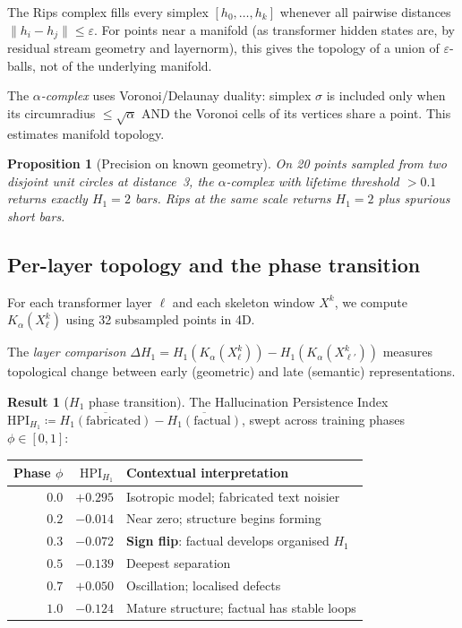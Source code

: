 \documentclass[11pt]{amsart}
\newtheorem{proposition}[theorem]{Proposition}
\theoremstyle{definition}
\newtheorem{result}[theorem]{Result}
\newcommand{\Ka}{K_\alpha}
\newcommand{\defeq}{\coloneqq}
\begin{document}
The Rips complex fills every simplex $[h_0,\ldots,h_k]$
whenever all pairwise distances $\|h_i - h_j\| \leq \varepsilon$.
For points near a manifold (as transformer hidden states are,
by residual stream geometry and layernorm), this gives the topology
of a union of $\varepsilon$-balls, not of the underlying manifold.

The \emph{$\alpha$-complex} uses Voronoi/Delaunay duality:
simplex $\sigma$ is included only when its circumradius $\leq \sqrt{\alpha}$
AND the Voronoi cells of its vertices share a point.
This estimates manifold topology.

\begin{proposition}[Precision on known geometry]
On 20 points sampled from two disjoint unit circles at distance~3,
the $\alpha$-complex with lifetime threshold $> 0.1$ returns exactly
$H_1 = 2$ bars.
Rips at the same scale returns $H_1 = 2$ plus spurious short bars.
\end{proposition}

\subsection{Per-layer topology and the phase transition}

For each transformer layer $\ell$ and each skeleton window $X^k$,
we compute $\Ka(X^k_\ell)$ using 32 subsampled points in 4D.

The \emph{layer comparison} $\Delta H_1 = H_1(\Ka(X^k_\ell)) - H_1(\Ka(X^k_{\ell'}))$
measures topological change between early (geometric) and late (semantic)
representations.

\begin{result}[$H_1$ phase transition]
\label{result:h1phase}
The Hallucination Persistence Index
$\mathrm{HPI}_{H_1} \defeq \overline{H_1(\text{fabricated})} - \overline{H_1(\text{factual})}$,
swept across training phases $\phi \in [0,1]$:
\begin{center}
\begin{tabular}{@{}rrl@{}}
\toprule
Phase $\phi$ & $\mathrm{HPI}_{H_1}$ & Contextual interpretation \\
\midrule
$0.0$ & $+0.295$ & Isotropic model; fabricated text noisier \\
$0.2$ & $-0.014$ & Near zero; structure begins forming \\
$0.3$ & $-0.072$ & \textbf{Sign flip}: factual develops organised $H_1$ \\
$0.5$ & $-0.139$ & Deepest separation \\
$0.7$ & $+0.050$ & Oscillation; localised defects \\
$1.0$ & $-0.124$ & Mature structure; factual has stable loops \\
\bottomrule
\end{tabular}
\end{center}
\end{result}
\end{document}
